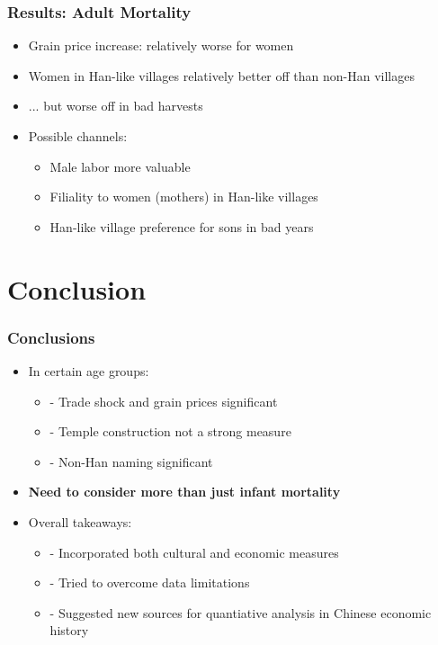 \begin{frame}[label=resultsadults]
\frametitle{Results: Adult Mortality \hyperlink{robustness}{}}
\begin{itemize}
\item Grain price increase: relatively worse for women
\item Women in Han-like villages relatively better off than non-Han villages
\item ... but worse off in bad harvests
\pause
\item Possible channels:
{\small
\begin{itemize}
\item Male labor more valuable\\
\item Filiality to women (mothers) in Han-like villages\\
\item Han-like village preference for sons in bad years\\
\end{itemize}
}
\end{itemize}
\end{frame}



\section{Conclusion}

\begin{frame}
\frametitle{Conclusions}
\begin{itemize}
\item In certain age groups:
{\small
\begin{itemize}
\item - Trade shock and grain prices significant
\item - Temple construction not a strong measure
\item - Non-Han naming significant 
\end{itemize}
}
\pause
\item \textbf{Need to consider more than just infant mortality} %
\pause
\item Overall takeaways:
{\small
\begin{itemize}
\item - Incorporated both cultural and economic measures\\

\item - Tried to overcome data limitations \\

\item - Suggested new sources for quantiative analysis in Chinese economic history\\
\end{itemize}
}
\end{itemize}
\end{frame}




